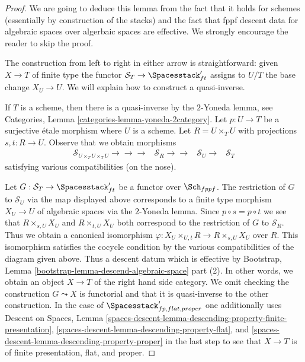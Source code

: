\begin{proof}
We are going to deduce this lemma from the fact that it holds for schemes
(essentially by construction of the stacks) and the fact that fppf descent
data for algebraic spaces over algerbaic spaces are effective.
We strongly encourage the reader to skip the proof.

\medskip\noindent
The construction from left to right in either arrow is straightforward:
given $X \to T$ of finite type the functor
$\mathcal{S}_T \to  \Spacesstack'_{ft}$ assigns to $U/T$ the
base change $X_U \to U$. We will explain how to construct a quasi-inverse.

\medskip\noindent
If $T$ is a scheme, then there is a quasi-inverse by the $2$-Yoneda lemma, see
Categories, Lemma \ref{categories-lemma-yoneda-2category}.
Let $p : U \to T$ be a surjective \'etale morphism where $U$ is a scheme.
Let $R = U \times_T U$ with projections $s, t : R \to U$.
Observe that we obtain morphisms
$$
\begin{array}{cccc}\mathcal{S}_{U \times_T U \times_T U} \longrightarrow\longrightarrow\longrightarrow & \mathcal{S}_R \longrightarrow\longrightarrow & \mathcal{S}_U \longrightarrow & \mathcal{S}_T\end{array}
$$
satisfying various compatibilities (on the nose).

\medskip\noindent
Let $G : \mathcal{S}_T \to \Spacesstack'_{ft}$ be a functor over $\Sch_{fppf}$.
The restriction of $G$ to $\mathcal{S}_U$ via the map displayed above
corresponds to a finite type morphism $X_U \to U$ of algebraic spaces
via the $2$-Yoneda lemma. Since $p \circ s = p \circ t$ we see that
$R \times_{s, U} X_U$ and $R \times_{t, U} X_U$ both correspond to the
restriction of $G$ to $\mathcal{S}_R$. Thus we obtain a canonical isomorphism
$\varphi : X_U \times_{U, t} R \to R \times_{s, U} X_U$ over $R$.
This isomorphism satisfies the cocycle condition by the
various compatibilities of the diagram given above.
Thus a descent datum which is effective by Bootstrap, Lemma
\ref{bootstrap-lemma-descend-algebraic-space} part (2).
In other words, we obtain an object $X \to T$ of the right hand side
category. We omit checking the construction $G \leadsto X$
is functorial and that it is quasi-inverse to the other construction.
In the case of $\Spacesstack'_{fp, flat, proper}$ one additionally uses
Descent on Spaces, Lemma
\ref{spaces-descent-lemma-descending-property-finite-presentation},
\ref{spaces-descent-lemma-descending-property-flat}, and
\ref{spaces-descent-lemma-descending-property-proper}
in the last step to see that $X \to T$ is of finite presentation,
flat, and proper.
\end{proof}

